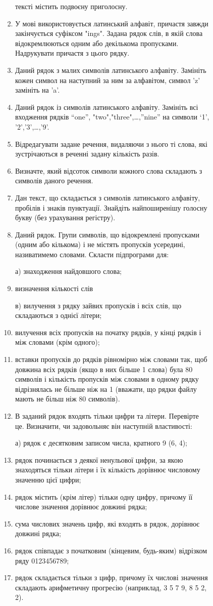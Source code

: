 \documentclass[]{article}
\makeatletter
\newcommand{\xslalph}[1]{\expandafter\@xslalph\csname c@#1\endcsname}
\newcommand{\@xslalph}[1]{%
    \ifcase#1\or а\or б\or в\or г\or д\or e\or є\or ж\or з\or i%
    \or й\or к\or л\or м\or н\or о\or п\or р\or с\or т%
    \or у\or ф\or х\or ц\or ч\or ш\or ю\or я\or аа\or бб\or вв%
    \else\@ctrerr\fi%
}
\makeatother
\begin{document}
\begin{enumerate}
\begin{enumerate}[label=\xslalph*)]
\begin{enumerate}
\begin{enumerate}[label=\xslalph*)]
\begin{enumerate}
  тексті містить подвоєну приголосну.
\item
  У мові використовується латинський алфавіт, причастя завжди
  закінчується суфіксом "ings". Задана рядок слів, в якій слова
  відокремлюються одним або декількома пропусками. Надрукувати причастя
  з цього рядку.
\item
  Даний рядок з малих символів латинського алфавіту. Замініть кожен
  символ на наступний за ним за алфавітом, символ 'z' замініть на 'a'.
\item
  Даний рядок із символів латинського алфавіту. Замініть всі входження
  рядків ``one'', "two","three",\ldots{},''nine'' на символи `1',
  '2','3',\ldots{},'9'.
\item
  Відредагувати задане речення, видаляючи з нього ті слова, які
  зустрічаються в реченні задану кількість разів.
\item
  Визначте, який відсоток символи кожного слова складають з символів
  даного речення.
\item
  Дан текст, що складається з символів латинського алфавіту, пробілів і
  знаків пунктуації. Знайдіть найпоширенішу голосну букву (без
  урахування регістру).
\item
  Даний рядок. Групи символів, що відокремлені пропусками (одним або
  кількома) і не містять пропусків усередині, називатимемо словами.
  Скласти підпрограми для:

а) знаходження найдовшого слова;
\item визначення кількості слів

в) вилучення з рядку зайвих пропусків і всіх слів, що складаються з
однієї літери;
\item вилучення всіх пропусків на початку рядків, у кінці рядків і між
словами (крім одного);
\item вставки пропусків до рядків рівномірно між словами так, щоб довжина
всіх рядків (якщо в них більше 1 слова) була 80 символів і кількість пропусків 
між словами в одному рядку відрізнялась не більше ніж на 1 (вважати, що рядки файлу мають не більш ніж 80 символів).

\item
В заданий рядок входять тільки цифри та літери. Перевірте це.
Визначити, чи задовольняє він наступній властивості:

а) рядок є десятковим записом числа, кратного 9 (6, 4);
\item рядок починається з деякої ненульової цифри, за якою знаходяться
тільки літери і їх кількість дорівнює числовому значенню цієї цифри;
\item рядок містить (крім літер) тільки одну цифру, причому її числове
значення дорівнює довжині рядка;
\item сума числових значень цифр, які входять в рядок, дорівнює довжині
рядка;
\item рядок співпадає з початковим (кінцевим, будь-яким) відрізком ряду
0123456789;
\item рядок складається тільки з цифр, причому їх числові значення
складають арифметичну прогресію (наприклад, 3 5 7 9, 8 5 2, 2).


\end{enumerate}
\end{enumerate}
\end{enumerate}
\end{enumerate}
\end{enumerate}
\end{document}
